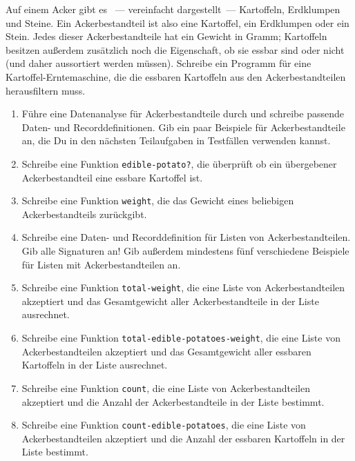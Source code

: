 \begin{aufgabe}
   Auf einem Acker gibt es ~--- vereinfacht
  dargestellt~--- Kartoffeln, Erdklumpen und Steine.  Ein
  Ackerbestandteil ist also eine Kartoffel, ein Erdklumpen oder ein
  Stein.  Jedes dieser Ackerbestandteile hat ein Gewicht in Gramm;
  Kartoffeln besitzen außerdem zusätzlich noch die Eigenschaft, ob sie
  essbar sind oder nicht (und daher aussortiert werden müssen).
  Schreibe ein Programm für eine Kartoffel-Erntemaschine, die die
  essbaren Kartoffeln aus den Ackerbestandteilen herausfiltern muss.

  \begin{enumerate}
  \item Führe eine Datenanalyse für
    Ackerbestandteile durch und schreibe passende Daten- und
    Recorddefinitionen.  Gib ein paar Beispiele für
    Ackerbestandteile an, die Du in den nächsten Teilaufgaben in
    Testfällen verwenden kannst.

  \item Schreibe eine Funktion
    \texttt{edible-potato?}, die überprüft ob ein übergebener
    Ackerbestandteil eine essbare Kartoffel ist.

  \item Schreibe eine Funktion \texttt{weight}, 
    die das Gewicht eines beliebigen Ackerbestandteils zurückgibt.

  \item Schreibe eine Daten- und Recorddefinition
    für Listen von Ackerbestandteilen.  Gib alle Signaturen an!
    Gib außerdem mindestens fünf verschiedene Beispiele für Listen
    mit Ackerbestandteilen an.

  \item Schreibe eine Funktion \texttt{total-weight},
    die eine Liste von Ackerbestandteilen akzeptiert und das Gesamtgewicht
    aller Ackerbestandteile in der Liste ausrechnet.

  \item Schreibe eine Funktion
    \texttt{total-edible-potatoes-weight}, die eine Liste von Ackerbestandteilen
    akzeptiert und das Gesamtgewicht aller essbaren Kartoffeln in der Liste
    ausrechnet.

  \item Schreibe eine Funktion \texttt{count}, die 
    eine Liste von Ackerbestandteilen akzeptiert und die Anzahl der
    Ackerbestandteile in der Liste bestimmt.

  \item Schreibe eine Funktion
    \texttt{count-edible-potatoes}, die eine Liste von
    Ackerbestandteilen akzeptiert und die Anzahl der essbaren
    Kartoffeln in der Liste bestimmt.


\end{enumerate}
\end{aufgabe}
